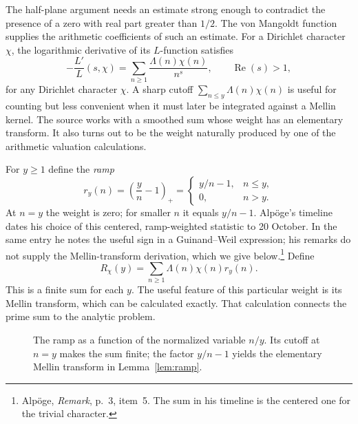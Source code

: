 \documentclass[11pt,openany,oneside]{scrbook}
\theoremstyle{definition}
\theoremstyle{remark}
\newcommand{\Rea}{\operatorname{Re}}
\begin{document}
The half-plane argument needs an estimate strong enough to contradict the presence of a zero with real part greater than $1/2$. The von Mangoldt function supplies the arithmetic coefficients of such an estimate. For a Dirichlet character $\chi$, the logarithmic derivative of its $L$-function satisfies
\[
-\frac{L'}{L}(s,\chi)=\sum_{n\ge1}\frac{\Lambda(n)\chi(n)}{n^s},
\qquad \Rea(s)>1,
\]
for any Dirichlet character $\chi$. A sharp cutoff $\sum_{n\le y}\Lambda(n)\chi(n)$ is useful for counting but less convenient when it must later be integrated against a Mellin kernel. The source works with a smoothed sum whose weight has an elementary transform. It also turns out to be the weight naturally produced by one of the arithmetic valuation calculations.

For $y\ge1$ define the \emph{ramp}
\[
 r_y(n)=\left(\frac yn-1\right)_+
 =\begin{cases}y/n-1,&n\le y,\\0,&n>y.\end{cases}
\]
At $n=y$ the weight is zero; for smaller $n$ it equals $y/n-1$. Alp\"oge's timeline dates his choice of this centered, ramp-weighted statistic to 20 October. In the same entry he notes the useful sign in a Guinand--Weil expression; his remarks do not supply the Mellin-transform derivation, which we give below.\footnote{Alp\"oge, \emph{Remark}, p.~3, item~5. The sum in his timeline is the centered one for the trivial character.} Define
\begin{equation}\label{eq:ramp}
R_\chi(y)=\sum_{n\ge1}\Lambda(n)\chi(n)r_y(n).
\end{equation}
This is a finite sum for each $y$. The useful feature of this particular weight is its Mellin transform, which can be calculated exactly. That calculation connects the prime sum to the analytic problem.


\begin{figure}[ht]
\centering
{}
\caption{The ramp as a function of the normalized variable $n/y$. Its cutoff at $n=y$ makes the sum finite; the factor $y/n-1$ yields the elementary Mellin transform in Lemma~\ref{lem:ramp}.}
\label{fig:ramp}
\end{figure}
\end{document}
